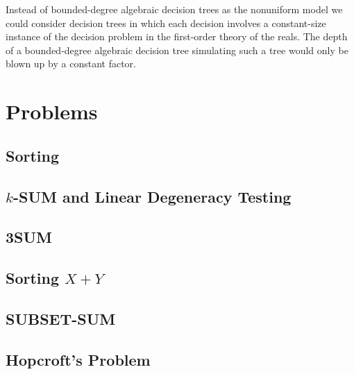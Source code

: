 
Instead of bounded-degree algebraic decision trees as the nonuniform model
we could consider decision trees in which
each decision involves a constant-size instance of the decision problem in the
first-order theory of the reals. The depth of a bounded-degree algebraic
decision tree simulating such a tree would only be blown up by a constant factor.


\chapter{Problems}

\section{Sorting}

\section{\(k\)-SUM and Linear Degeneracy Testing}

\section{3SUM}

\section{Sorting \(X+Y\)}

\section{SUBSET-SUM}

\section{Hopcroft's Problem}

